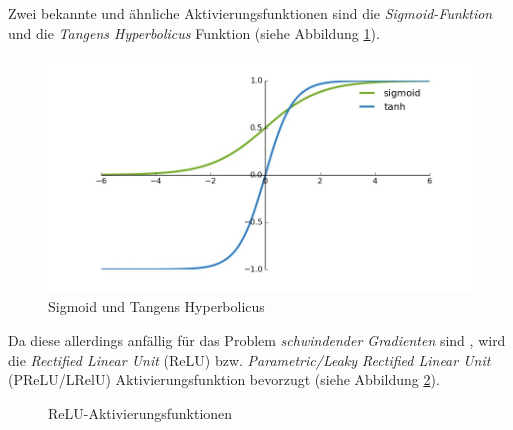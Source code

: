 Zwei bekannte und ähnliche Aktivierungsfunktionen sind die \textit{Sigmoid-Funktion} und die \textit{Tangens Hyperbolicus} Funktion (siehe Abbildung \ref{sigmoid}).

\begin{figure}[ht]
	\begin{center}
		\includegraphics[width=16cm]{Bilder/sigmoid.jpg} 
		\caption[Sigmoid und Tangens Hyperbolicus]{Sigmoid und Tangens Hyperbolicus \cite{RonnyRestrepo.20170816}}
		\label{sigmoid}
	\end{center}
\end{figure}

Da diese allerdings anfällig für das Problem \textit{schwindender Gradienten} sind \cite[S. 276]{AurelienGeron.2018}, wird die \textit{Rectified Linear Unit} (ReLU) bzw. \textit{Parametric/Leaky Rectified Linear Unit} (PReLU/LRelU) Aktivierungsfunktion bevorzugt (siehe Abbildung \ref{relu}). 

\begin{figure}[ht]
	\caption[ReLU-Aktivierungsfunktionen]{ReLU-Aktivierungsfunktionen \cite{DanqingLiu.20171130}} 
	\label{relu}
\end{figure} 

